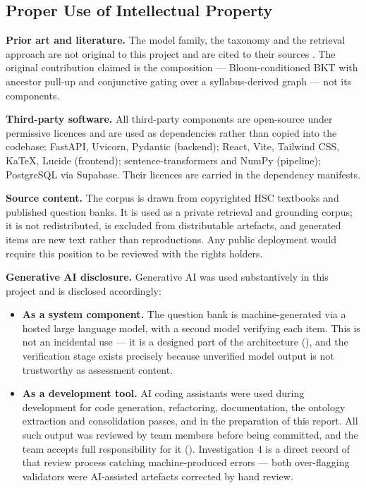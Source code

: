 \subsection{Proper Use of Intellectual Property}
\label{sec:ip}

\textbf{Prior art and literature.} The model family, the taxonomy and the
retrieval approach are not original to this project and are cited to their
sources \cite{corbett1995knowledge,bloom1956taxonomy,anderson2001revised,doignon1985spaces,lewis2020retrieval,vygotsky1978mind}.
The original contribution claimed is the composition --- Bloom-conditioned BKT
with ancestor pull-up and conjunctive gating over a syllabus-derived graph --- not
its components.

\textbf{Third-party software.} All third-party components are open-source under
permissive licences and are used as dependencies rather than copied into the
codebase: FastAPI, Uvicorn, Pydantic (backend); React, Vite, Tailwind CSS,
KaTeX, Lucide (frontend); sentence-transformers and NumPy (pipeline); PostgreSQL
via Supabase. Their licences are carried in the dependency manifests.

\textbf{Source content.} The corpus is drawn from copyrighted HSC textbooks and
published question banks. It is used as a private retrieval and grounding
corpus; it is not redistributed, is excluded from distributable artefacts, and
generated items are new text rather than reproductions. Any public deployment
would require this position to be reviewed with the rights holders.

\textbf{Generative AI disclosure.} Generative AI was used substantively in this
project and is disclosed accordingly:
\begin{itemize}
  \item \textbf{As a system component.} The question bank is machine-generated
    via a hosted large language model, with a second model verifying each item.
    This is not an incidental use --- it is a designed part of the architecture
    (), and the verification stage exists
    precisely because unverified model output is not trustworthy as assessment
    content.
  \item \textbf{As a development tool.} AI coding assistants were used during
    development for code generation, refactoring, documentation, the ontology
    extraction and consolidation passes, and in the preparation of this report.
    All such output was reviewed by team members before being committed, and the
    team accepts full responsibility for it ().
    Investigation 4 is a direct record of that review process catching
    machine-produced errors --- both over-flagging validators were AI-assisted
    artefacts corrected by hand review.
\end{itemize}

